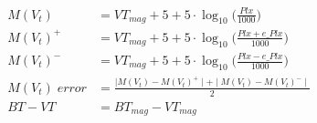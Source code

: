 \documentclass{article}
\begin{document}
\vspace{50pt}

\begin{equation*}
	\begin{aligned}
		M(V_t) &= VT_{mag} + 5 + 5 \cdot \log_{10}\bigg(\frac{Plx}{1000}\bigg)\\[15pt]
		M(V_t)^{+} &= VT_{mag} + 5 + 5 \cdot \log_{10}\bigg(\frac{Plx + e\_Plx}{1000}\bigg)\\[15pt]
		M(V_t)^{-} &= VT_{mag} + 5 + 5 \cdot \log_{10}\bigg(\frac{Plx - e\_Plx}{1000}\bigg)\\[15pt]
		M(V_t) \; error & = \frac{\mid M(V_t) - M(V_t)^{+} \mid + \mid M(V_t) - M(V_t)^{-} \mid}{2}\\[15pt]
		BT - VT &= BT_{mag} - VT_{mag}
	\end{aligned}
\end{equation*}

\newpage
\end{document}

